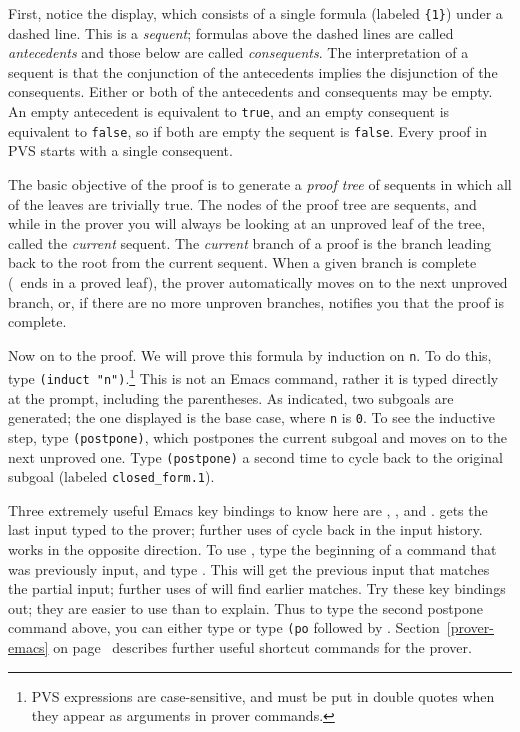 First, notice the display, which consists of a single formula (labeled
\texttt{\{1\}}) under a dashed line.  This is a
\emph{sequent}; formulas above the dashed lines are called
\emph{antecedents} and those below are called
\emph{consequents}.  The interpretation of a sequent is
that the conjunction of the antecedents implies the disjunction of the
consequents.  Either or both of the antecedents and consequents may be
empty.  An empty antecedent is equivalent to \texttt{true}, and an empty
consequent is equivalent to \texttt{false}, so if both are empty the
sequent is \texttt{false}.  Every proof in PVS starts with a single
consequent.

The basic objective of the proof is to generate a \emph{proof
tree} of sequents in which all of the leaves are
trivially true.  The nodes of the proof tree are sequents, and while in
the prover you will always be looking at an unproved leaf of the tree,
called the \emph{current} sequent. The
\emph{current} branch of a proof is the branch
leading back to the root from the current sequent.  When a given branch is
complete (\ie\ ends in a proved leaf), the prover automatically moves on
to the next unproved branch, or, if there are no more unproven branches,
notifies you that the proof is complete.

Now on to the proof.  We will prove this formula by induction on
\texttt{n}.  To do this, type \texttt{(induct "n")}.\footnote{PVS expressions are
case-sensitive, and must be put in double quotes when they appear as
arguments in prover commands.} This is not an Emacs command, rather it
is typed directly at the prompt, including the parentheses.  As indicated,
two subgoals are generated; the one displayed is the base case, where
\texttt{n} is \texttt{0}.  To see the inductive step, type
\texttt{(postpone)},
which postpones the current subgoal and moves on to the next unproved one.
Type \texttt{(postpone)} a second time to cycle back to the original
subgoal (labeled \texttt{closed\_form.1}).

Three extremely useful Emacs key bindings to know here are ,
, and .   gets the last input typed to the
prover; further uses of  cycle back in the input history.
 works in the opposite direction.  To use , type the
beginning of a command that was previously input, and type .
This will get the previous input that matches the partial input; further
uses of  will find earlier matches.  Try these key bindings out;
they are easier to use than to explain.  Thus to type the second postpone
command above, you can either type  or type \texttt{(po} followed
by .  Section~\ref{prover-emacs} on page~\pageref{prover-emacs}
describes further useful shortcut commands for the prover.

